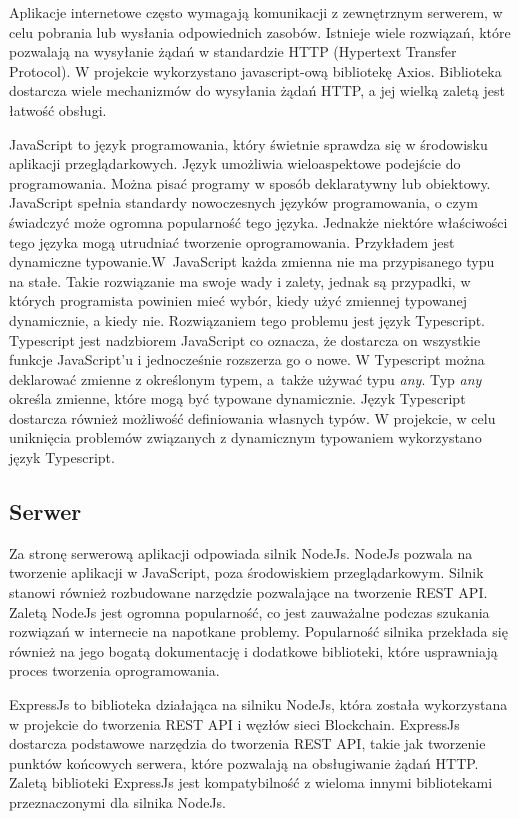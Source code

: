 \documentclass[a4paper,12pt]{book}
\begin{document}
Aplikacje internetowe często wymagają komunikacji z zewnętrznym serwerem, w celu pobrania lub wysłania odpowiednich zasobów. Istnieje wiele rozwiązań, które pozwalają na wysyłanie żądań w standardzie HTTP (Hypertext Transfer Protocol). W projekcie wykorzystano javascript-ową bibliotekę Axios. Biblioteka dostarcza wiele mechanizmów do wysyłania żądań HTTP, a jej wielką zaletą jest łatwość obsługi.

JavaScript to język programowania, który świetnie sprawdza się w środowisku aplikacji przeglądarkowych. Język umożliwia wieloaspektowe podejście do programowania. Można pisać programy w sposób deklaratywny lub obiektowy. JavaScript spełnia standardy nowoczesnych języków programowania, o czym świadczyć może ogromna popularność tego języka. Jednakże niektóre właściwości tego języka mogą utrudniać tworzenie oprogramowania. Przykładem jest dynamiczne typowanie.W~JavaScript każda zmienna nie ma przypisanego typu na stałe. Takie rozwiązanie ma swoje wady i zalety, jednak są przypadki, w których programista powinien mieć wybór, kiedy użyć zmiennej typowanej dynamicznie, a kiedy nie. Rozwiązaniem tego problemu jest język Typescript. Typescript jest nadzbiorem JavaScript co oznacza, że dostarcza on wszystkie funkcje JavaScript'u i jednocześnie rozszerza go o nowe. W Typescript można deklarować zmienne z określonym typem, a~także używać typu \textit{any}. Typ \textit{any} określa zmienne, które mogą być typowane dynamicznie. Język Typescript dostarcza również możliwość definiowania własnych typów. W projekcie, w celu uniknięcia problemów związanych z dynamicznym typowaniem wykorzystano język Typescript.

\subsection{Serwer}
Za stronę serwerową aplikacji odpowiada silnik NodeJs. NodeJs pozwala na tworzenie aplikacji w JavaScript, poza środowiskiem przeglądarkowym. Silnik stanowi również rozbudowane narzędzie pozwalające na tworzenie REST API. Zaletą NodeJs jest ogromna popularność, co jest zauważalne podczas szukania rozwiązań w internecie na napotkane problemy. Popularność silnika przekłada się również na jego bogatą dokumentację i dodatkowe biblioteki, które usprawniają proces tworzenia oprogramowania.

ExpressJs to biblioteka działająca na silniku NodeJs, która została wykorzystana w projekcie do tworzenia REST API i węzłów sieci Blockchain. ExpressJs dostarcza podstawowe narzędzia do tworzenia REST API, takie jak tworzenie punktów końcowych serwera, które pozwalają na obsługiwanie żądań HTTP. Zaletą biblioteki ExpressJs jest kompatybilność z wieloma innymi bibliotekami przeznaczonymi dla silnika NodeJs.
\end{document}
